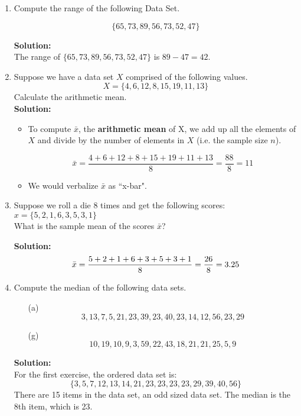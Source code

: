\documentclass[a4paper,12pt]{article}
\begin{document}
\begin{enumerate}

\item Compute the range of the following Data Set.

\[\{65,73,89,56,73,52,47\}\]

\noindent \textbf{Solution:}\\
The range of $\{65,73,89,56,73,52,47\}$ is $ 89-47 = 42$.

\item 
Suppose we have a data set $X$ comprised of the following values. 
		\[X = \{4,6,12,8,15,19,11, 13\}\]
		Calculate the arithmetic mean.\\
\noindent \textbf{Solution:}\\
		\begin{itemize}
		\item To compute $\bar{x}$, the \textbf{arithmetic mean} of X, we add up all the elements of $X$ and divide by the number of elements in $X$ (i.e. the sample size $n$).
		
		\[ \bar{x} = \frac{4+6+12+8+15+19+11+13}{8} =\frac{88}{8} = 11\] 
		\item We would verbalize $\bar{x}$ as ``x-bar".
	\end{itemize}

\item 
	
	Suppose we roll a die 8 times and get the following scores: $x = \{ 5, 2, 1, 6, 3, 5, 3, 1\}$ \\ 
	What is the sample mean of the scores $\bar{x}$?
	
	
\noindent \textbf{Solution:}\\	
	\[ \bar{x}  = {5 + 2 +  1 +  6 +  3 +  5 +  3 +  1 \over 8 } = {26 \over 8} =  3.25 \]

\item Compute the median of the following data sets.
	\begin{itemize}
		\item[(a)] 
		\[3, 13, 7, 5, 21, 23, 39, 23, 40, 23, 14, 12, 56, 23, 29\]
		\item[(g)] 
		\[10, 19, 10, 9, 3, 59, 22, 43, 18, 21, 21, 25, 5, 9\]
	\end{itemize}
\noindent \textbf{Solution:}\\
For the first exercise, the ordered data set is:
\[ \{3, 5, 7, 12, 13, 14, 21, 23, 23, 23, 23, 29, 39, 40, 56\}\]
There are 15 items in the data set, an odd sized data set. The median is the 8th item, which is 23.
	

\end{enumerate}
\end{document}
